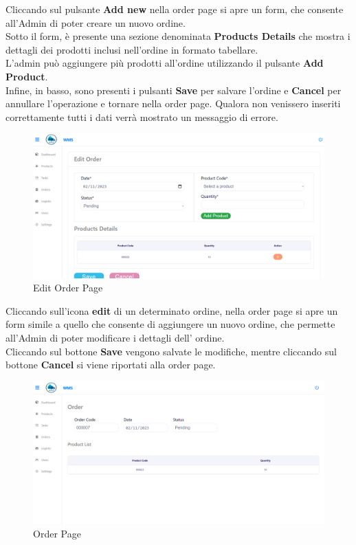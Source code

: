 Cliccando sul pulsante \textbf{Add new} nella order page si apre un form, che consente
all'Admin di poter creare un nuovo ordine.\\
Sotto il form, è presente una sezione denominata \textbf{Products Details} che mostra i dettagli dei prodotti inclusi
nell'ordine in formato tabellare.\\
L'admin può  aggiungere più prodotti all'ordine utilizzando il pulsante \textbf{Add Product}.\\
Infine, in basso, sono presenti i pulsanti \textbf{Save} per salvare l'ordine e \textbf{Cancel} per annullare l'operazione
e tornare nella order page.
Qualora non venissero inseriti correttamente tutti i dati verrà mostrato un messaggio di errore.

\begin{figure}[H]
    \centering
    \includegraphics[width=\textwidth]{document/sections/img/Storyboard/editOrderPage.png}
    \caption{Edit Order Page}
    \label{fig:editOrderPage}
\end{figure}

Cliccando sull'icona \textbf{edit} di un determinato ordine, nella order page si apre un form simile a quello che
consente di aggiungere un nuovo ordine, che permette all'Admin di poter modificare i dettagli dell' ordine.\\
Cliccando sul bottone \textbf{Save} vengono salvate le modifiche, mentre cliccando sul bottone \textbf{Cancel} si viene
riportati alla order page.

\begin{figure}[H]
    \centering
    \includegraphics[width=\textwidth]{document/sections/img/Storyboard/viewOrder.png}
    \caption{Order Page}
    \label{fig:viewOrdersPage}
\end{figure}


